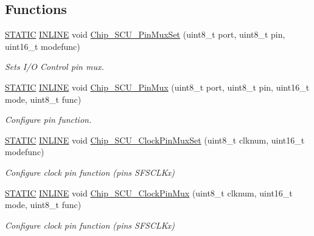 \subsection*{Functions}
\begin{DoxyCompactItemize}
\item 
\hyperlink{group___l_p_c___types___public___macros_ga10b2d890d871e1489bb02b7e70d9bdfb}{S\+T\+A\+T\+IC} \hyperlink{spifi__18xx__43xx_8h_a2eb6f9e0395b47b8d5e3eeae4fe0c116}{I\+N\+L\+I\+NE} void \hyperlink{group___s_c_u__18_x_x__43_x_x_gaf7f798c364e281b3aa3247516e0a913e}{Chip\+\_\+\+S\+C\+U\+\_\+\+Pin\+Mux\+Set} (uint8\+\_\+t port, uint8\+\_\+t pin, uint16\+\_\+t modefunc)
\begin{DoxyCompactList}\small\item\em Sets I/O Control pin mux. \end{DoxyCompactList}\item 
\hyperlink{group___l_p_c___types___public___macros_ga10b2d890d871e1489bb02b7e70d9bdfb}{S\+T\+A\+T\+IC} \hyperlink{spifi__18xx__43xx_8h_a2eb6f9e0395b47b8d5e3eeae4fe0c116}{I\+N\+L\+I\+NE} void \hyperlink{group___s_c_u__18_x_x__43_x_x_ga6bca03c66ecebe85cbecd51afb3f0009}{Chip\+\_\+\+S\+C\+U\+\_\+\+Pin\+Mux} (uint8\+\_\+t port, uint8\+\_\+t pin, uint16\+\_\+t mode, uint8\+\_\+t func)
\begin{DoxyCompactList}\small\item\em Configure pin function. \end{DoxyCompactList}\item 
\hyperlink{group___l_p_c___types___public___macros_ga10b2d890d871e1489bb02b7e70d9bdfb}{S\+T\+A\+T\+IC} \hyperlink{spifi__18xx__43xx_8h_a2eb6f9e0395b47b8d5e3eeae4fe0c116}{I\+N\+L\+I\+NE} void \hyperlink{group___s_c_u__18_x_x__43_x_x_ga5ee82d9fd5e174d422df2a2e5baeae88}{Chip\+\_\+\+S\+C\+U\+\_\+\+Clock\+Pin\+Mux\+Set} (uint8\+\_\+t clknum, uint16\+\_\+t modefunc)
\begin{DoxyCompactList}\small\item\em Configure clock pin function (pins S\+F\+S\+C\+L\+Kx) \end{DoxyCompactList}\item 
\hyperlink{group___l_p_c___types___public___macros_ga10b2d890d871e1489bb02b7e70d9bdfb}{S\+T\+A\+T\+IC} \hyperlink{spifi__18xx__43xx_8h_a2eb6f9e0395b47b8d5e3eeae4fe0c116}{I\+N\+L\+I\+NE} void \hyperlink{group___s_c_u__18_x_x__43_x_x_ga9b46fb9a2976c97279e2db19798f4736}{Chip\+\_\+\+S\+C\+U\+\_\+\+Clock\+Pin\+Mux} (uint8\+\_\+t clknum, uint16\+\_\+t mode, uint8\+\_\+t func)
\begin{DoxyCompactList}\small\item\em Configure clock pin function (pins S\+F\+S\+C\+L\+Kx) \end{DoxyCompactList}\item 

\end{DoxyCompactItemize}
